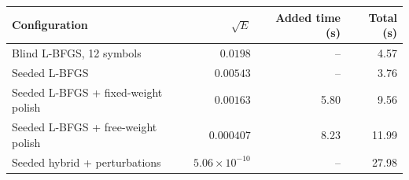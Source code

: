\begin{tabular}{@{}lrrr@{}}\toprule
Configuration & $\sqrt E$ & Added time (s) & Total (s)\\\midrule
Blind L-BFGS, 12 symbols & $0.0198$ & -- & 4.57\\
Seeded L-BFGS & $0.00543$ & -- & 3.76\\
Seeded L-BFGS + fixed-weight polish & $0.00163$ & 5.80 & 9.56\\
Seeded L-BFGS + free-weight polish & $0.000407$ & 8.23 & 11.99\\
Seeded hybrid + perturbations & $5.06\times10^{-10}$ & -- & 27.98\\
\bottomrule\end{tabular}
